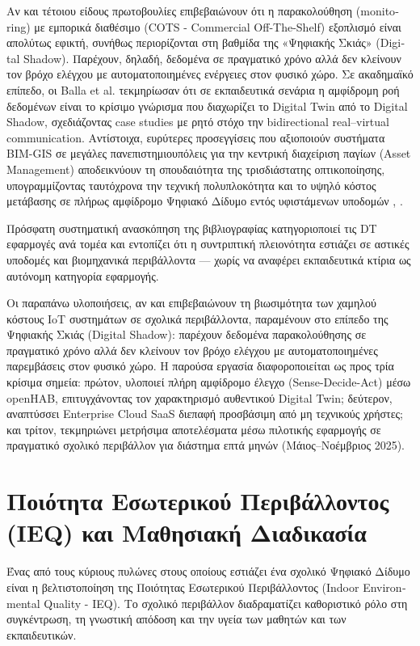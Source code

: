 Αν και τέτοιου είδους πρωτοβουλίες επιβεβαιώνουν ότι η παρακολούθηση (\textlatin{monitoring}) με εμπορικά διαθέσιμο (\textlatin{COTS - Commercial Off-The-Shelf}) εξοπλισμό είναι απολύτως εφικτή, συνήθως περιορίζονται στη βαθμίδα της «Ψηφιακής Σκιάς» (\textlatin{Digital Shadow}). Παρέχουν, δηλαδή, δεδομένα σε πραγματικό χρόνο αλλά δεν κλείνουν τον βρόχο ελέγχου με αυτοματοποιημένες ενέργειες στον φυσικό χώρο. Σε ακαδημαϊκό επίπεδο, οι \textlatin{Balla et al.} \cite{Balla2023} τεκμηρίωσαν ότι σε εκπαιδευτικά σενάρια η αμφίδρομη ροή δεδομένων είναι το κρίσιμο γνώρισμα που διαχωρίζει το \textlatin{Digital Twin} από το \textlatin{Digital Shadow}, σχεδιάζοντας \textlatin{case studies} με ρητό στόχο την \textlatin{bidirectional real--virtual communication}. Αντίστοιχα, ευρύτερες προσεγγίσεις που αξιοποιούν συστήματα \textlatin{BIM-GIS} σε μεγάλες πανεπιστημιουπόλεις για την κεντρική διαχείριση παγίων (\textlatin{Asset Management}) αποδεικνύουν τη σπουδαιότητα της τρισδιάστατης οπτικοποίησης, υπογραμμίζοντας ταυτόχρονα την τεχνική πολυπλοκότητα και το υψηλό κόστος μετάβασης σε πλήρως αμφίδρομο Ψηφιακό Δίδυμο εντός υφιστάμενων υποδομών \cite{Evangelou2022}, \cite{Fuller2020}.

Πρόσφατη συστηματική ανασκόπηση της βιβλιογραφίας \cite{Doulka2024} κατηγοριοποιεί τις \textlatin{DT} εφαρμογές ανά τομέα και εντοπίζει ότι η συντριπτική πλειονότητα εστιάζει σε αστικές υποδομές και βιομηχανικά περιβάλλοντα --- χωρίς να αναφέρει εκπαιδευτικά κτίρια ως αυτόνομη κατηγορία εφαρμογής.

Οι παραπάνω υλοποιήσεις, αν και επιβεβαιώνουν τη βιωσιμότητα των χαμηλού κόστους \textlatin{IoT} συστημάτων σε σχολικά περιβάλλοντα, παραμένουν στο επίπεδο της Ψηφιακής Σκιάς (\textlatin{Digital Shadow}): παρέχουν δεδομένα παρακολούθησης σε πραγματικό χρόνο αλλά δεν κλείνουν τον βρόχο ελέγχου με αυτοματοποιημένες παρεμβάσεις στον φυσικό χώρο. Η παρούσα εργασία διαφοροποιείται ως προς τρία κρίσιμα σημεία: πρώτον, υλοποιεί πλήρη αμφίδρομο έλεγχο (\textlatin{Sense-Decide-Act}) μέσω \textlatin{openHAB}, επιτυγχάνοντας τον χαρακτηρισμό αυθεντικού \textlatin{Digital Twin}; δεύτερον, αναπτύσσει \textlatin{Enterprise Cloud SaaS} διεπαφή προσβάσιμη από μη τεχνικούς χρήστες; και τρίτον, τεκμηριώνει μετρήσιμα αποτελέσματα μέσω πιλοτικής εφαρμογής σε πραγματικό σχολικό περιβάλλον για διάστημα επτά μηνών (Μάιος--Νοέμβριος 2025).

\section{Ποιότητα Εσωτερικού Περιβάλλοντος (\textlatin{IEQ}) και Μαθησιακή Διαδικασία}
Ένας από τους κύριους πυλώνες στους οποίους εστιάζει ένα σχολικό Ψηφιακό Δίδυμο είναι η βελτιστοποίηση της Ποιότητας Εσωτερικού Περιβάλλοντος (\textlatin{Indoor Environmental Quality - IEQ}). Το σχολικό περιβάλλον διαδραματίζει καθοριστικό ρόλο στη συγκέντρωση, τη γνωστική απόδοση και την υγεία των μαθητών και των εκπαιδευτικών.

